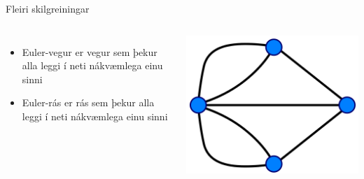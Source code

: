 \documentclass{beamer}
\begin{document}
\begin{frame}{Fleiri skilgreiningar}
\begin{columns}
\begin{itemize}
 \item Euler-vegur er vegur sem þekur alla leggi í neti nákvæmlega einu sinni
 \item Euler-rás er rás sem þekur alla leggi í neti nákvæmlega einu sinni
\end{itemize}
\includegraphics[width=\linewidth]{Pics/konigsberg3}
\end{columns}
\end{frame}
\end{document}
